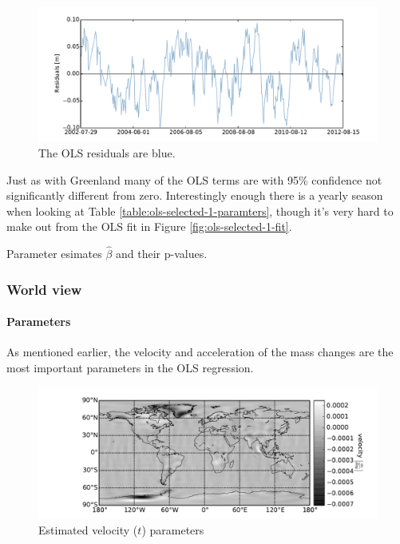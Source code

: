 \begin{figure}[H]
	\centering
	\includegraphics[width=\textwidth]{figures/ols-selected-1-residual}
	\caption{The OLS residuals are blue.}
	\label{fig:ols-selected-1-residual}
\end{figure}

Just as with Greenland many of the OLS terms are with 95\% confidence not significantly different from zero. Interestingly enough there is a yearly season when looking at Table \ref{table:ols-selected-1-paramters}, though it's very hard to make out from the OLS fit in Figure \ref{fig:ols-selected-1-fit}.

\begin{table}[H]
\centering
\centerline{}
\caption{Parameter esimates $\hat{\beta}$ and their p-values. }
\label{table:ols-selected-1-paramters}
\end{table}

\pagebreak
\subsubsection{World view}

\paragraph{Parameters}

As mentioned earlier, the velocity and acceleration of the mass changes are the most important parameters in the OLS regression.
\begin{figure}[H]
	\centering
	\includegraphics[width=\textwidth]{figures/ols-world-parameter-vel}
	\caption{Estimated velocity ($t$) parameters}
	\label{fig:ols-world-parameter-vel}
\end{figure}

